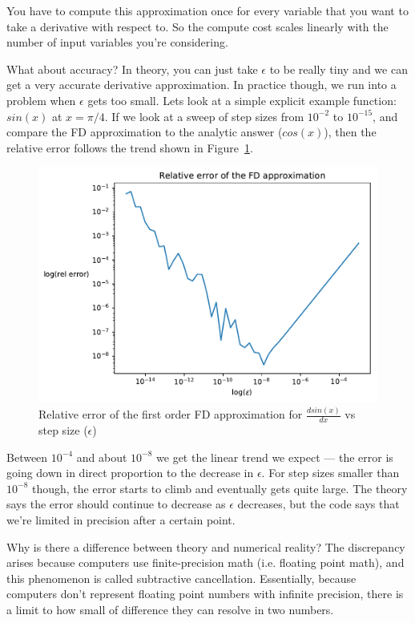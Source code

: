 \documentclass[conf]{new-aiaa}
\begin{document}
    You have to compute this approximation once for every variable that you want to take a derivative with respect to. 
    So the compute cost scales linearly with the number of input variables you're considering. 

    What about accuracy?
    In theory, you can just take $\epsilon$ to be really tiny and we can get a very accurate derivative approximation. 
    In practice though, we run into a problem when $\epsilon$ gets too small.
    Lets look at a simple explicit example function: $sin(x)$ at $x=\pi/4$.
    If we look at a sweep of step sizes from $10^{-2}$ to $10^{-15}$, and compare the FD approximation to the analytic answer ($cos(x)$), 
    then the relative error follows the trend shown in Figure~\ref{fig:fd_subtractive_cancellation}.
    \begin{figure}[H]
        \centering
        
        \includegraphics[width=.75\textwidth]{sin_fd.pdf}
        \caption{Relative error of the first order FD approximation for $\frac{d sin(x)}{dx}$ vs step size ($\epsilon$)}
        \label{fig:fd_subtractive_cancellation}
    \end{figure}
    Between $10^{-4}$ and about $10^{-8}$ we get the linear trend we expect --- the error is going down in direct proportion to the decrease in $\epsilon$. 
    For step sizes smaller than $10^{-8}$ though, the error starts to climb and eventually gets quite large. 
    The theory says the error should continue to decrease as $\epsilon$ decreases, 
    but the code says that we're limited in precision after a certain point. 

    Why is there a difference between theory and numerical reality? 
    The discrepancy arises because computers use finite-precision math (i.e. floating point math), 
    and this phenomenon is called subtractive cancellation. 
    Essentially, because computers don't represent floating point numbers with infinite precision, there is a limit to how small of difference they can resolve in two numbers. 
\end{document}
